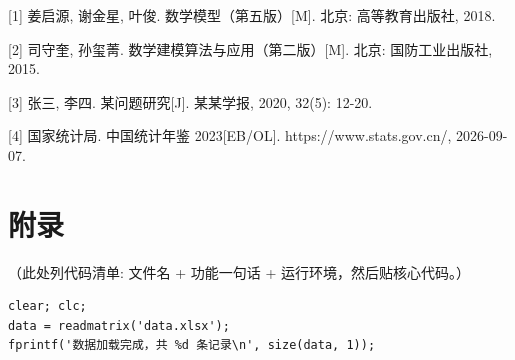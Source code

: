 \documentclass[12pt,a4paper,fontset=windows]{ctexart}
\begin{document}
[1] 姜启源, 谢金星, 叶俊. 数学模型（第五版）[M]. 北京: 高等教育出版社, 2018.

[2] 司守奎, 孙玺菁. 数学建模算法与应用（第二版）[M]. 北京: 国防工业出版社, 2015.

[3] 张三, 李四. 某问题研究[J]. 某某学报, 2020, 32(5): 12-20.

[4] 国家统计局. 中国统计年鉴 2023[EB/OL]. https://www.stats.gov.cn/, 2026-09-07.

\newpage
\appendix
\section*{附录}
（此处列代码清单: 文件名 + 功能一句话 + 运行环境，然后贴核心代码。）

\begin{lstlisting}[style=matlabstyle, caption={示例: main.m 主程序框架}, label={lst:main}]
% main.m - 问题一求解主程序
clear; clc;
data = readmatrix('data.xlsx');
fprintf('数据加载完成，共 %d 条记录\n', size(data, 1));
\end{lstlisting}
\end{document}
